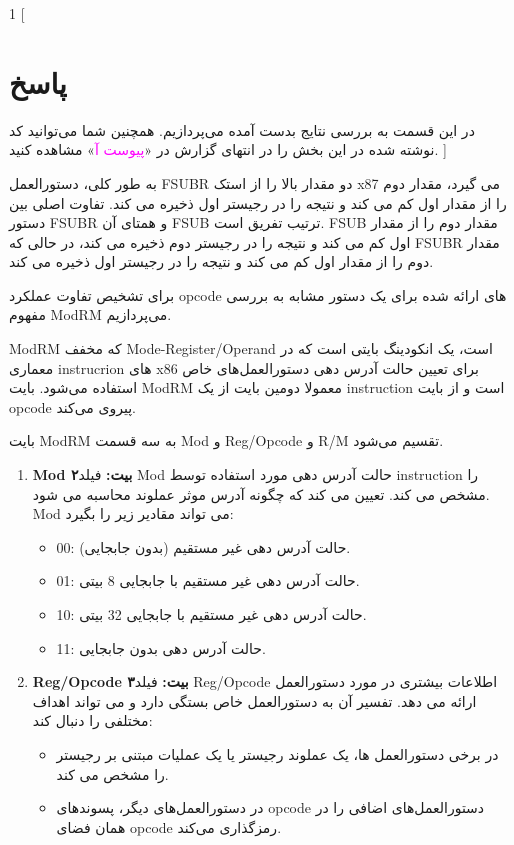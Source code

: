 \documentclass[12pt]{exam}
\begin{document}
\begin{multicols}{1}
	[
	\section{پاسخ}
	در این قسمت به بررسی نتایج بدست آمده می‌پردازیم. همچنین شما می‌توانید کد‌ نوشته شده در این بخش را در انتهای گزارش در «\textcolor{magenta}{پیوست آ}» مشاهده کنید.
	]
		
		
	
به طور کلی، دستورالعمل FSUBR دو مقدار بالا را از استک x87 می گیرد، مقدار دوم را از مقدار اول کم می کند و نتیجه را در رجیستر اول ذخیره می کند. تفاوت اصلی بین دستور FSUBR و همتای آن FSUB ترتیب تفریق است. FSUB مقدار دوم را از مقدار اول کم می کند و نتیجه را در رجیستر دوم ذخیره می کند، در حالی که FSUBR مقدار دوم را از مقدار اول کم می کند و نتیجه را در رجیستر اول ذخیره می کند.

برای تشخیص تفاوت عملکرد opcode های ارائه شده برای یک دستور مشابه به بررسی مفهوم ModRM می‌پردازیم.

ModRM که مخفف Mode-Register/Operand است، یک انکودینگ بایتی است که در معماری instrucrion های x86 برای تعیین حالت آدرس دهی دستور‌العمل‌های خاص استفاده می‌شود. بایت ModRM معمولا دومین بایت از یک instruction است و از بایت opcode پیروی می‌کند.

بایت ModRM به سه قسمت Mod و Reg/Opcode و R/M تقسیم می‌شود.

\begin{enumerate}
	\item \textbf{Mod ۲بیت: }
فیلد Mod حالت آدرس دهی مورد استفاده توسط instruction را مشخص می کند. تعیین می کند که چگونه آدرس موثر عملوند محاسبه می شود. Mod می تواند مقادیر زیر را بگیرد:
	\begin{itemize}
		\item  00: حالت آدرس دهی غیر مستقیم (بدون جابجایی).
		\item  01: حالت آدرس دهی غیر مستقیم با جابجایی 8 بیتی.
		\item  10: حالت آدرس دهی غیر مستقیم با جابجایی 32 بیتی.
		\item  11: حالت آدرس دهی بدون جابجایی.
	\end{itemize}
	
	\item \textbf{Reg/Opcode ۳بیت: }
فیلد Reg/Opcode اطلاعات بیشتری در مورد دستورالعمل ارائه می دهد. تفسیر آن به دستورالعمل خاص بستگی دارد و می تواند اهداف مختلفی را دنبال کند:

	\begin{itemize}
		\item  در برخی دستورالعمل ها، یک عملوند رجیستر یا یک عملیات مبتنی بر رجیستر را مشخص می کند.
		\item در دستورالعمل‌های دیگر، پسوندهای opcode دستورالعمل‌های اضافی را در همان فضای opcode رمزگذاری می‌کند.
	\end{itemize}


\end{enumerate}
\end{multicols}
\end{document}
